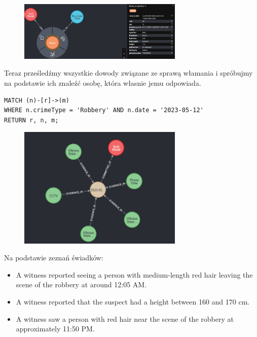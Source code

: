 \documentclass[a4paper,12pt]{article}
\begin{document}
\begin{figure}[h!]
    \centering
    \includegraphics[width=0.7\textwidth]{paula_harris.png}
\end{figure}

Teraz prześledźmy wszystkie dowody związane ze sprawą włamania i spróbujmy na podstawie ich znaleźć osobę, która własnie jemu odpowiada.

\begin{center}
\begin{minipage}{0.8\linewidth}
\begin{lstlisting}[language=Cypher, basicstyle=\small, breaklines=true]
MATCH (n)-[r]->(m)
WHERE n.crimeType = 'Robbery' AND n.date = '2023-05-12' 
RETURN r, n, m;
\end{lstlisting}
\end{minipage}
\end{center}

\begin{figure}[h!]
    \centering
    \includegraphics[width=0.7\textwidth]{robbery.png} 
\end{figure}

\newpage
Na podstawie zeznań świadków:

\begin{itemize}
    \item A witness reported seeing a person with medium-length red hair leaving the scene of the robbery at around 12:05 AM.
    \item A witness reported that the suspect had a height between 160 and 170 cm.
    \item A witness saw a person with red hair near the scene of the robbery at approximately 11:50 PM.
\end{itemize}
\end{document}
